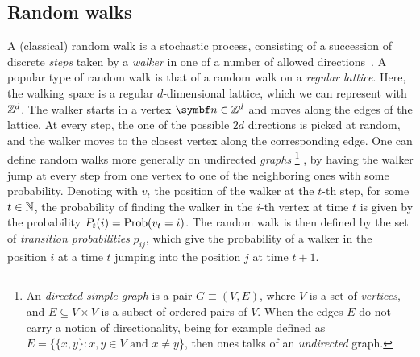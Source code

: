 \subsection{Random walks}
A (classical) random walk is a stochastic process, consisting of a succession of discrete \textit{steps} taken by a \textit{walker} in one of a number of allowed directions~\cite{lovasz1993random}.
A popular type of random walk is that of a random walk on a \textit{regular lattice}. Here, the walking space is a regular $d$-dimensional lattice, which we can represent with $\mathbb{Z}^d$. The walker starts in a vertex $\bs n\in\ZZ^d$ and moves along the edges of the lattice.
At every step, the one of the possible $2d$ directions is picked at random, and the walker moves to the closest vertex along the corresponding edge.
One can define random walks more generally on undirected \textit{graphs}
\footnote{An \textit{directed simple graph} is a pair $G\equiv (V,E)$, where $V$ is a set of \textit{vertices}, and $E\subseteq V\times V$ is a subset of ordered pairs of $V$. When the edges $E$ do not carry a notion of directionality, being for example defined as $E=\{\{x,y\} : x,y\in V\text{ and }x\neq y\}$, then ones talks of an \textit{undirected} graph.}
, by having the walker jump at every step from one vertex to one of the neighboring ones with some probability.
Denoting with $v_t$ the position of the walker at the $t$-th step, for some $t\in\mathbb{N}$, the probability of finding the walker in the $i$-th vertex at time $t$ is given by the probability
$P_t(i)=\operatorname*{Prob}(v_t=i)$. The random walk is then defined by the set of \textit{transition probabilities} $p_{ij}$, which give the probability of a walker in the position $i$ at a time $t$ jumping into the position $j$ at time $t+1$.


